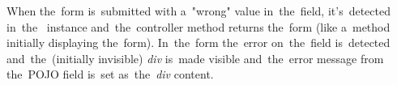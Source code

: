 \noindent When the~form is~submitted with a~"wrong" value in~the~field, it's~detected in~the~ instance and~the~controller method returns the~form (like a~method initially displaying the~form).
In~the~form the~error on~the~field is~detected and~the~(initially invisible) \textit{div} is~made visible and~the~error message from the~POJO field is~set as~the~\textit{div} content.

\todo
